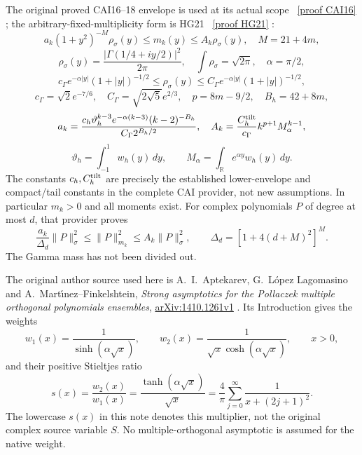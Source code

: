 \documentclass[11pt]{article}
\newcommand{\R}{\mathbb R}
\begin{document}
The original proved CAI16--18 envelope is used at its actual scope
\cite{CAI}%
~\href{https://github.com/KokunoYumeto/zeta-function-research-reader/blob/487253b5b01851da5b9b98af4e146fecf1fab902/workbenches/splitzero-tandem/continuations/20260919-full-window-source-products/providers/CAI_COMPLETE_PREREQUISITE.tex\#L284}{[proof CAI16]}%
{}; the arbitrary-fixed-multiplicity form is HG21 \cite{HG}%
~\href{https://github.com/KokunoYumeto/zeta-function-research-reader/blob/5992ad50c0f2a06921f1fcaded7b4e38097c0739/workbenches/splitzero-tandem/continuations/20260920-original-kernel-mixed-determinants/providers/HEAT_GROWTH_AND_ORIGINAL_CURRENTS.tex\#L374}{[proof HG21]}%
{}:
\begin{equation}\label{eq:CAI}
 a_k(1+y^2)^{-M}\rho_\sigma(y)\leq m_k(y)\leq A_k\rho_\sigma(y),
 \quad M=21+4m,
\end{equation}
\[
 \rho_\sigma(y)=\frac{|\Gamma(1/4+iy/2)|^2}{2\pi},\quad
 \int\rho_\sigma=\sqrt{2\pi},\quad\alpha=\pi/2,
\]
\[
 c_\Gamma e^{-\alpha|y|}(1+|y|)^{-1/2}
 \leq\rho_\sigma(y)\leq
 C_\Gamma e^{-\alpha|y|}(1+|y|)^{-1/2},
\]
\[
 c_\Gamma=\sqrt2e^{-7/6},\quad C_\Gamma=\sqrt{2\sqrt5}e^{2/3},
 \quad p=8m-9/2,\quad B_h=42+8m,
\]
\[
 a_k=\frac{c_h\vartheta_h^{k-3}e^{-\alpha(k-3)}(k-2)^{-B_h}}
                   {C_\Gamma2^{B_h/2}},\quad
 A_k=\frac{C_h^{\rm tilt}}{c_\Gamma}k^{p+1}M_\alpha^{k-1},
\]
\[
 \vartheta_h=\int_{-1}^1w_h(y)\,dy,\qquad
 M_\alpha=\int_\R e^{\alpha y}w_h(y)\,dy.
\]
The constants $c_h,C_h^{\rm tilt}$ are precisely the established
lower-envelope and compact/tail constants in the complete CAI
provider, not new assumptions. In particular $m_k>0$ and all
moments exist. For complex polynomials $P$ of degree at most $d$,
that provider proves
\begin{equation}\label{eq:CAI-finite}
 \frac{a_k}{\Delta_d}\|P\|_\sigma^2
       \leq\|P\|_{m_k}^2\leq A_k\|P\|_\sigma^2,
 \qquad \Delta_d=[1+4(d+M)^2]^M.
\end{equation}
The Gamma mass has not been divided out.

The original author source used here is A.~I.~Aptekarev,
G.~L\'opez Lagomasino and A.~Mart\'{\i}nez--Finkelshtein,
\emph{Strong asymptotics for the Pollaczek multiple orthogonal
polynomials ensembles},
\href{https://arxiv.org/abs/1410.1261v1}{arXiv:1410.1261v1}
\cite{ALM}.
Its Introduction gives the weights
\begin{equation}\label{eq:literature}
 w_1(x)=\frac1{\sinh(\alpha\sqrt x)},\qquad
 w_2(x)=\frac1{\sqrt x\cosh(\alpha\sqrt x)},\qquad x>0,
\end{equation}
and their positive Stieltjes ratio
\begin{equation}\label{eq:S}
 s(x)=\frac{w_2(x)}{w_1(x)}
     =\frac{\tanh(\alpha\sqrt x)}{\sqrt x}
     =\frac4\pi\sum_{j=0}^{\infty}\frac1{x+(2j+1)^2}.
\end{equation}
The lowercase $s(x)$ in this note denotes this multiplier, not
the original complex source variable $S$. No multiple-orthogonal
asymptotic is assumed for the native weight.
\end{document}
